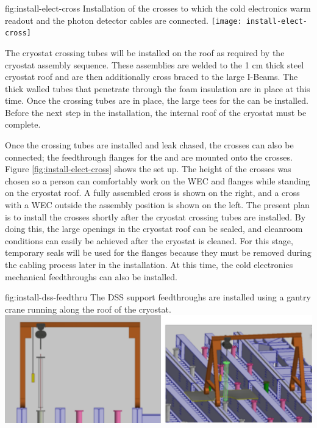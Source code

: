 \begin{dunefigure}{fig:install-elect-cross}
  {Installation of the crosses to which the cold electronics warm readout and the photon detector cables are connected.}
 \texttt{[image: install-elect-cross]}
\end{dunefigure}

The cryostat crossing tubes will be installed on the roof as required by the cryostat assembly sequence. 
These assemblies are welded to the 1 \si{cm} thick steel cryostat roof and are then additionally cross braced to the large I-Beams. 
The thick walled tubes that penetrate through the foam insulation are in place at this time. 
Once the crossing tubes are in place, the large tees for the  can be installed. 
Before the next step in the installation, the internal roof of the cryostat must be complete. 



Once the crossing tubes are installed and leak chased, the crosses can also be connected; the feedthrough flanges for the  and  are mounted onto the crosses. Figure \ref{fig:install-elect-cross} shows the set up. 
The height of the crosses was chosen so a person can comfortably work on the WEC  and  flanges while standing on the cryostat roof. 
A fully assembled cross is shown on the right, and a cross with a WEC outside the assembly position is shown on the left. 
The present plan is to install the crosses shortly after the cryostat crossing tubes are installed. 
By doing this, the large openings in the cryostat roof can be sealed, and cleanroom conditions can easily be achieved after the cryostat is cleaned. 
For this stage, temporary seals will be used for the flanges because they must be removed during the cabling process later in the installation. At this time, the cold electronics mechanical feedthroughs can also be installed. 

\begin{dunefigure}{fig:install-dss-feedthru}
  {The DSS support feedthroughs are installed using a gantry crane running along the roof of the cryostat.}
 \includegraphics[width=.95\textwidth]{graphics/dss-feedthru-install.pdf}
\end{dunefigure}

